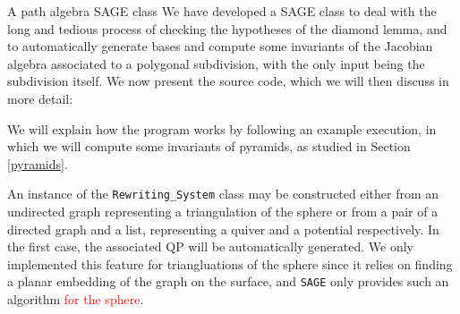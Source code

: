 \begin{chapter}{A path algebra SAGE class}
\label{appendix}
We have developed a SAGE class to deal with the long and tedious process of checking the hypotheses of the diamond lemma, and to automatically generate bases and compute some invariants of the Jacobian algebra associated to a polygonal subdivision, with the only input being the subdivision itself. We now present the source code, which we will then discuss in more detail:

We will explain how the program works by following an example execution, in which we will compute some invariants of pyramids, as studied in Section \ref{pyramids}.

An instance of the \texttt{Rewriting\_System} class may be constructed either from an undirected graph representing a triangulation of the sphere or from a pair of a directed graph and a list, representing a quiver and a potential respectively. In the first case, the associated QP will be automatically generated. We only implemented this feature for triangluations of the sphere since it relies on finding a planar embedding of the graph on the surface, and \texttt{SAGE} only provides such an algorithm \textcolor{red}{for the sphere}.


\end{chapter}
